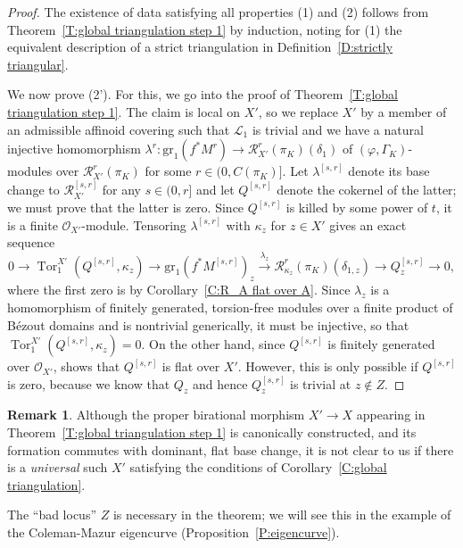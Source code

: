 \documentclass[12pt]{article}
\theoremstyle{definition}
\newtheorem{remark}[theorem]{Remark}
\numberwithin{equation}{theorem}
\newcommand{\calL}{\mathcal{L}}
\newcommand{\calO}{\mathcal{O}}
\newcommand{\calR}{\mathcal{R}}
\newcommand{\gr}{\mathrm{gr}}
\DeclareMathOperator{\Tor}{Tor}
\begin{document}
\begin{proof}
The existence of data satisfying all properties (1) and (2) follows from Theorem~\ref{T:global triangulation step 1} by induction, noting for (1) the equivalent description of a strict triangulation in Definition~\ref{D:strictly triangular}.

We now prove (2').  For this, we go into the proof of
Theorem~\ref{T:global triangulation step 1}.  The claim is local on
$X'$, so we replace $X'$ by a member of an admissible affinoid
covering such that $\calL_1$ is trivial and we have a natural
injective homomorphism $\lambda^r: \gr_1(f^*M^r) \to
\calR_{X'}^r(\pi_K)(\delta_1)$ of $(\varphi, \Gamma_K)$-modules over
$\calR_{X'}^r(\pi_K)$ for some $r \in (0, C(\pi_K)]$.  Let
  $\lambda^{[s,r]}$ denote its base change to $\calR_{X'}^{[s,r]}$ for
  any $s \in (0,r]$ and let $Q^{[s,r]}$ denote the cokernel of the
    latter; we must prove that the latter is zero.  Since $Q^{[s,r]}$ is killed by some power of $t$, it is a
    finite $\calO_{X'}$-module.  Tensoring $\lambda^{[s,r]}$ with
    $\kappa_z$ for $z \in X'$ gives an exact sequence
\begin{equation}\label{E:sequence for Q}
0 \to \Tor_1^{X'}(Q^{[s,r]}, \kappa_z)
\to \gr_1(f^*M^{[s,r]})_z \xrightarrow{\lambda_z} \calR^r_{\kappa_z}(\pi_K)(\delta_{1,z}) \to Q^{[s,r]}_z \to 0,
\end{equation}
where the first zero is by Corollary~\ref{C:R_A flat over A}.  Since
$\lambda_z$ is a homomorphism of finitely generated, torsion-free
modules over a finite product of B\'ezout domains and is nontrivial
generically, it must be injective, so that $\Tor_1^{X'}(Q^{[s,r]},
\kappa_z) = 0$.  On the other hand, since $Q^{[s,r]}$ is finitely
generated over $\calO_{X'}$, \cite[Exercise~6.2]{eisenbud} shows that
$Q^{[s,r]}$ is flat over $X'$.  However, this is only possible if
$Q^{[s,r]}$ is zero, because we know that $Q_z$ and hence
$Q_z^{[s,r]}$ is trivial at $z \notin Z$.
\end{proof}

\begin{remark}
Although the proper birational morphism $X' \to X$ appearing in Theorem~\ref{T:global triangulation step 1} is canonically constructed,
and its formation commutes with dominant, flat base change,
it is not clear to us if there is a \emph{universal} such $X'$ satisfying the conditions of 
Corollary~\ref{C:global triangulation}.

The ``bad locus'' $Z$ is necessary in the theorem; we will see this in
the example of the Coleman-Mazur eigencurve
(Proposition~\ref{P:eigencurve}).
\end{remark}
\end{document}
